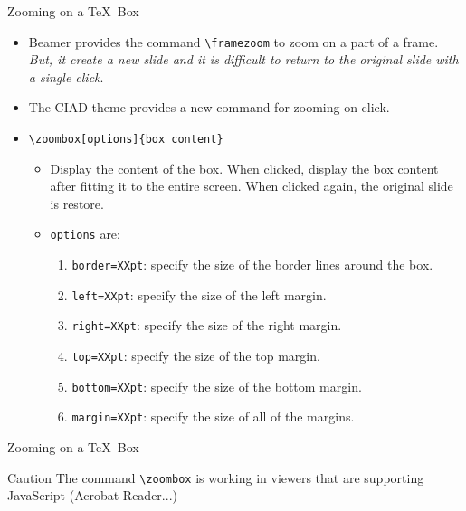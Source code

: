 \documentclass[english,sectioncirclenumberstyle]{ciadbeamer}
\begin{document}
\begin{frame}[t]{Zooming on a \TeX\ Box}
	\begin{itemize}
	\item Beamer provides the command \texttt{{\textbackslash}framezoom} to zoom on a part of a frame. \emph{But, it create a new slide and it is difficult to return to the original slide with a single click}.	
	\item The CIAD theme provides a new command for zooming on click.
	\item \texttt{{\textbackslash}zoombox[options]\{box content\}}
		\begin{itemize}
		\item Display the content of the box. When clicked, display the box content after fitting it to the entire screen. When clicked again, the original slide is restore.
		\item \texttt{options} are:
			\begin{enumerate}
			\item \texttt{border=XXpt}: specify the size of the border lines around the box.
			\item \texttt{left=XXpt}: specify the size of the left margin.
			\item \texttt{right=XXpt}: specify the size of the right margin.
			\item \texttt{top=XXpt}: specify the size of the top margin.
			\item \texttt{bottom=XXpt}: specify the size of the bottom margin.
			\item \texttt{margin=XXpt}: specify the size of all of the margins.
			\end{enumerate}
		\end{itemize}
	\end{itemize}
\end{frame}

\begin{frame}[t]{Zooming on a \TeX\ Box \insertcontinuationtext}
	\begin{alertblock}{Caution}
	The command \texttt{{\textbackslash}zoombox} is working in viewers that are supporting JavaScript (Acrobat Reader...)
	\end{alertblock}
	\vspace{1em}
	\begin{center}
	\end{center}
\end{frame}
\end{document}
